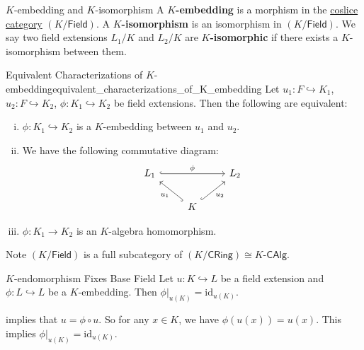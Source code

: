 \begin{definition}{$K$-embedding and $K$-isomorphism}{}
 A \textbf{$K$-embedding} is a morphism in the \hyperref[th:coslice_category]{coslice category} $(K/\mathsf{Field})$. A \textbf{$K$-isomorphism} is an isomorphism in $(K/\mathsf{Field})$. We say two field extensions $L_1/K$ and $L_2/K$ are \textbf{$K$-isomorphic} if there exists a $K$-isomorphism between them.
\end{definition}

\begin{proposition}{Equivalent Characterizations of $K$-embedding}{equivalent_characterizations_of_K_embedding}
    Let $u_1:F\hookrightarrow K_1$, $u_2:F\hookrightarrow K_2$, $\phi:K_1\hookrightarrow K_2$ be field extensions. Then the following are equivalent:
    \begin{enumerate}[(i)]
        \item $\phi:K_1\hookrightarrow K_2$ is a $K$-embedding between $u_1$ and $u_2$.
        \item We have the following commutative diagram:
        \[
        \begin{tikzcd}
            L_1 \arrow[rr, "\phi", hook] &                                                    & L_2 \\
                                        & K \arrow[lu, "u_1", hook] \arrow[ru, "u_2"', hook] &    
        \end{tikzcd}
        \]
        \item $\phi:K_1\to K_2$ is an $K$-algebra homomorphism.
    \end{enumerate}
\end{proposition}
\begin{prf}
Note $(K/\mathsf{Field})$ is a full subcategory of $(K/\mathsf{CRing})\cong K\text{-}\mathsf{CAlg}$. 
\end{prf}

\begin{corollary}{$K$-endomorphism Fixes Base Field}{}
    Let $u:K\hookrightarrow L$ be a field extension and $\phi:L\hookrightarrow L$ be a $K$-embedding. Then $\phi|_{u(K)}=\mathrm{id}_{u(K)}$.
\end{corollary}
\begin{prf}
     implies that $u=\phi\circ u$. So for any $x\in K$, we have $\phi(u(x))=u(x)$. This implies $\phi|_{u(K)}=\mathrm{id}_{u(K)}$.
\end{prf}

